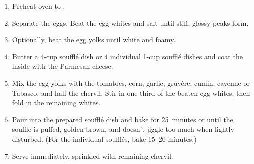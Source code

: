 
\begin{ingredients}
\end{ingredients}


\begin{recipe}
  \begin{enumerate}

  \item Preheat oven to .

  \item Separate the eggs.  Beat the egg whites and salt until stiff,
    glossy peaks form.

  \item Optionally, beat the egg yolks until white and foamy.

  \item Butter a 4-cup souffl\'e dish or 4 individual  1-cup souffl\'e
    dishes and coat the inside with the Parmesan cheese.

  \item Mix the egg yolks with the tomatoes, corn, garlic, gruy\`ere, cumin,
    cayenne or Tabasco, and half the chervil.  Stir in one third of
    the beaten egg whites, then fold in the remaining whites.

  \item Pour into the prepared souffl\'e dish and bake for 25~minutes
    or until the souffl\'e is puffed, golden brown, and doesn't jiggle
    too much when lightly disturbed.  (For the individual souffl\'es,
    bake 15--20 minutes.)

  \item Serve immediately, sprinkled with remaining chervil.

  \end{enumerate}
\end{recipe}
